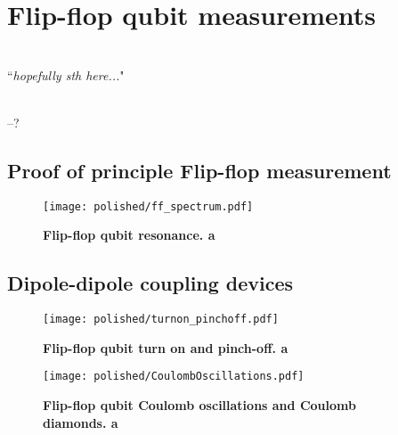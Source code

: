 
\chapter{Flip-flop qubit measurements} %

\label{Chapter7} %

\HRule
\vspace{0.5cm} \hspace{2cm}
\small
\hangindent=4cm
\\
        ``\emph{hopefully sth here...}"
\\ \\
\hangindent=4cm
\begin{flushright}
--? \\
\end{flushright}

\vspace{0.5cm}

\noindent \HRule
\clearpage

\section{Proof of principle Flip-flop measurement} \label{sec:ff_resonance}

\begin{figure}
	\centering
	\texttt{[image: polished/ff\_spectrum.pdf]}
	\caption[Flip-flop qubit resonance]{\textbf{Flip-flop qubit resonance. a}}
	\label{fig:ff_spectrum}
\end{figure}

\section{Dipole-dipole coupling devices} \label{sec:dd_meas}

\begin{figure}
	\centering
	\texttt{[image: polished/turnon\_pinchoff.pdf]}
	\caption[Flip-flop qubit turn on and pinch-off]{\textbf{Flip-flop qubit turn on and pinch-off. a}}
	\label{fig:turnon_pinchoff}
\end{figure}

\begin{figure}
	\centering
	\texttt{[image: polished/CoulombOscillations.pdf]}
	\caption[Flip-flop qubit Coulomb oscillations and diamonds]{\textbf{Flip-flop qubit Coulomb oscillations and Coulomb diamonds. a}}
	\label{fig:coulomb_oscillations}
\end{figure}

